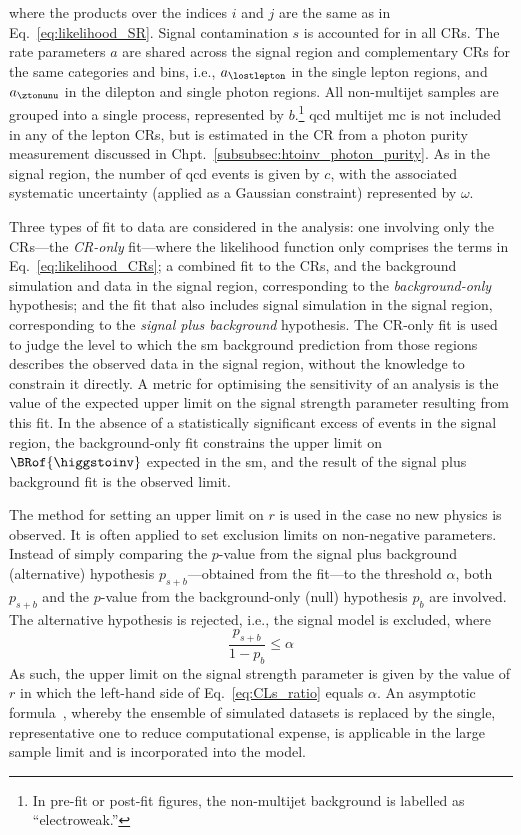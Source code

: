 where the products over the indices $i$ and $j$ are the same as in Eq.~\ref{eq:likelihood_SR}. Signal contamination $s$ is accounted for in all \glspl{CR}. The rate parameters $a$ are shared across the signal region and complementary \glspl{CR} for the same categories and \ptmiss bins, i.e., $a_{\lostlepton}$ in the single lepton regions, and $a_{\ztonunu}$ in the dilepton and single photon regions. All non-multijet samples are grouped into a single process, represented by $b$.\footnote{In pre-fit or post-fit figures, the non-multijet background is labelled as ``electroweak.''} \acrshort{qcd} multijet \acrshort{mc} is not included in any of the lepton \glspl{CR}, but is estimated in the \singlePhotonCr \gls{CR} from a photon purity measurement discussed in Chpt.~\ref{subsubsec:htoinv_photon_purity}. As in the signal region, the number of \acrshort{qcd} events is given by $c$, with the associated systematic uncertainty (applied as a Gaussian constraint) represented by $\omega$.

Three types of fit to data are considered in the analysis: one involving only the \glspl{CR}---the \emph{\gls{CR}-only} fit---where the likelihood function only comprises the terms in Eq.~\ref{eq:likelihood_CRs}; a combined fit to the \glspl{CR}, and the background simulation and data in the signal region, corresponding to the \emph{background-only} hypothesis; and the fit that also includes signal simulation in the signal region, corresponding to the \emph{signal plus background} hypothesis. The \gls{CR}-only fit is used to judge the level to which the \acrshort{sm} background prediction from those regions describes the observed data in the signal region, without the knowledge to constrain it directly. A metric for optimising the sensitivity of an analysis is the value of the expected upper limit on the signal strength parameter resulting from this fit. In the absence of a statistically significant excess of events in the signal region, the background-only fit constrains the upper limit on $\BRof{\higgstoinv}$ expected in the \acrshort{sm}, and the result of the signal plus background fit is the observed limit.

The \CLs method for setting an upper limit on $r$ is used in the case no new physics is observed. It is often applied to set exclusion limits on non-negative parameters. Instead of simply comparing the $p$-value from the signal plus background (alternative) hypothesis $p_{s+b}$---obtained from the fit---to the threshold $\alpha$, both $p_{s+b}$ and the $p$-value from the background-only (null) hypothesis $p_b$ are involved. The alternative hypothesis is rejected, i.e., the signal model is excluded, where
\begin{equation}
    \frac{p_{s+b}}{1 - p_b} \leq \alpha
    \label{eq:CLs_ratio}
\end{equation}
As such, the upper limit on the signal strength parameter is given by the value of $r$ in which the left-hand side of Eq.~\ref{eq:CLs_ratio} equals $\alpha$. An asymptotic formula~\cite{Cowan:2010js}, whereby the ensemble of simulated datasets is replaced by the single, representative one to reduce computational expense, is applicable in the large sample limit and is incorporated into the model.

